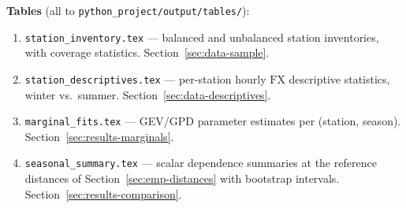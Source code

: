 \textbf{Tables} (all to \texttt{python\_project/output/tables/}):
\begin{enumerate}
    \item \texttt{station\_inventory.tex} — balanced and unbalanced
          station inventories, with coverage statistics.
          Section~\ref{sec:data-sample}.
    \item \texttt{station\_descriptives.tex} — per-station hourly
          \(\mathrm{FX}\) descriptive statistics, winter vs.\ summer.
          Section~\ref{sec:data-descriptives}.
    \item \texttt{marginal\_fits.tex} — GEV/GPD parameter
          estimates per (station, season).
          Section~\ref{sec:results-marginals}.
    \item \texttt{seasonal\_summary.tex} — scalar dependence
          summaries at the reference distances of
          Section~\ref{sec:emp-distances} with bootstrap intervals.
          Section~\ref{sec:results-comparison}.
\end{enumerate}
